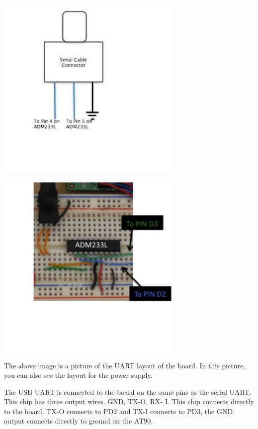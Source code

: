   \begin{center}
    \includegraphics[width=90mm]{imageSources/uartConnect2.png}
  \end{center}
  \label{uartConnect2}



  \begin{center}
    \includegraphics[width=90mm]{imageSources/uartConnect3.png}
  \end{center}
  \label{uartConnect3}


The above image is a picture of the UART layout of the board. In this picture, you can also see the layout for the power supply.

The USB UART is connected to the board on the same pins as the serial UART.  This chip has three output wires.  GND, TX-O, RX- I. This chip connects directly to the board. TX-O connects to PD2 and TX-I connects to PD3, the GND output connects directly to ground on the AT90.

